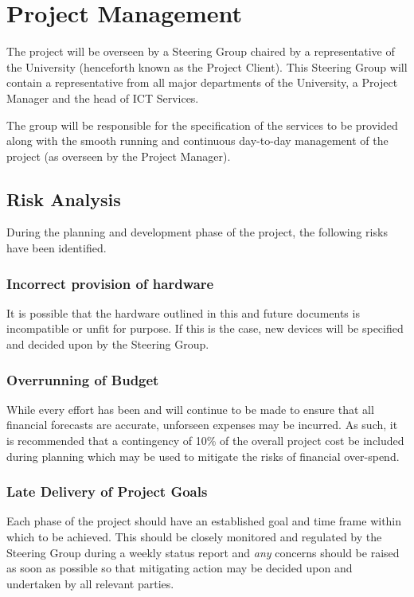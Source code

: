 \documentclass[a4paper, twoside]{article}
\begin{document}
\section{Project Management}
\label{sec:projman}
The project will be overseen by a Steering Group chaired by a representative of
the University (henceforth known as the Project Client). This Steering Group
will contain a representative from all major departments of the University, a
Project Manager and the head of ICT Services.

The group will be responsible for the specification of the services to be
provided along with the smooth running and continuous day-to-day management of the project
(as overseen by the Project Manager).

\subsection{Risk Analysis}
During the planning and development phase of the project, the following risks
have been identified.

\subsubsection{Incorrect provision of hardware}
It is possible that the hardware outlined in this and future documents is
incompatible or unfit for purpose. If this is the case, new devices will be
specified and decided upon by the Steering Group.

\subsubsection{Overrunning of Budget}
While every effort has been and will continue to be made to ensure that all
financial forecasts are accurate, unforseen expenses may be incurred. As such, it
is recommended that a contingency of 10\% of the overall project cost be
included during planning which may be used to mitigate the risks of financial
over-spend.

\subsubsection{Late Delivery of Project Goals}
Each phase of the project should have an established goal and time frame within
which to be achieved. This should be closely monitored and regulated by the
Steering Group during a weekly status report and \emph{any} concerns should be raised as soon as possible so
that mitigating action may be decided upon and undertaken by all relevant
parties.
\end{document}
